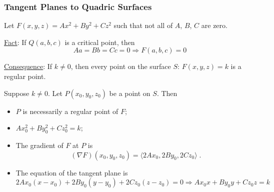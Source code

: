 \begin{frame}
  \frametitle{Tangent Planes to Quadric Surfaces}

  Let $F(x,y,z) = Ax^2+By^2+Cz^2$ such that not all of $A$, $B$, $C$ are zero.

  \medskip
  \underline{Fact}: If $Q(a,b,c)$ is a critical point, then
  $$Aa=Bb=Cc=0 \Longrightarrow F(a,b,c) = 0$$

\pause
\underline{Consequence}: If $k \neq 0$, then every point on the surface $S$: $F(x,y,z) = k$ is a regular point.

\pause
\medskip
Suppose $k\neq 0$. Let $P(x_0,y_0,z_0)$ be a point on $S$. Then
\begin{itemize}
  \item $P$ is necessarily a regular point of $F$;
  \item $Ax_0^2+By_0^2+Cz_0^2=k$;
  \item \pause The gradient of $F$ at $P$ is
%
$$(\nabla F)(x_0,y_0,z_0) = \langle 2Ax_0, 2By_0,2Cz_0 \rangle\; .$$
\item \pause The equation of the tangent plane is
%
$$2Ax_0(x-x_0) + 2By_0(y-y_0) + 2Cz_0 (z-z_0) = 0 \Longrightarrow Ax_0x + B y_0y + Cz_0z = k$$
\end{itemize}
\end{frame}